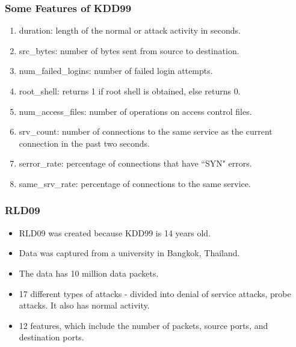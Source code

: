 \documentclass{beamer}
\begin{document}
\begin{frame}
  \frametitle{Some Features of KDD99}
	\begin{enumerate}
		\item duration: length of the normal or attack activity
in seconds.
		\item src\_bytes: number of bytes sent from source to destination.
		\item num\_failed\_logins: number of failed login attempts.
		\item root\_shell: returns 1 if root shell is obtained, else returns 0.
		\item num\_access\_files: number of operations on access control files.
		\item srv\_count: number of connections to the same service as the current connection in the past two seconds.
		\item serror\_rate: percentage of connections that have ``SYN" errors.
		\item same\_srv\_rate: percentage of connections to the same service.
	\end{enumerate}
\end{frame}



\begin{frame}
  \frametitle{RLD09}
	\begin{itemize}
		\item RLD09 was created because KDD99 is 14 years old.
		\item Data was captured from a university in Bangkok, Thailand.
		\item The data has 10 million data packets.
		\item 17 different types of attacks - divided into denial of service attacks, probe attacks. It also has normal activity.
		\item 12 features, which include the number of packets, source ports, and destination ports.
	\end{itemize}
\end{frame}
\end{document}
